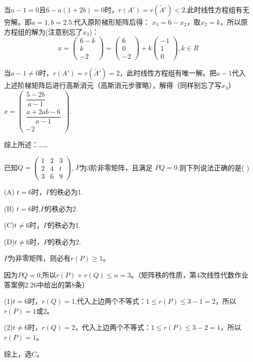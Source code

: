 \documentclass[a4paper]{report}
\begin{document}
\begin{jie}
当$a-1=0$且$6-a(1+2b)=0$时，$r(A')=r(\widetilde{A}')<2$,此时线性方程组有无穷解。即$a=1,b= 2.5$.代入原阶梯形矩阵后得：
$x_1=6-x_2$，取$x_2=k$，所以原方程组的解为(注意别忘了$x_3$)：
\begin{equation*}
  x=
  \begin{pmatrix}
   6-k\\ k\\ -2
  \end{pmatrix}=
  \begin{pmatrix}
    6\\ 0\\ -2
  \end{pmatrix}+k\begin{pmatrix}
                  -1\\ 1\\ 0
                \end{pmatrix},k\in R
\end{equation*}

当$a-1\neq 0$时，$r(A')=r(\widetilde{A}')=2$，此时线性方程组有唯一解。把$a-1$代入上述阶梯矩阵后进行高斯消元（高斯消元步骤略），解得（同样别忘了写$x_3$）$x
=\begin{pmatrix}
\dfrac{5-2b}{a-1}\\[2pt] \dfrac{a+2ab-6}{a-1}\\[2pt] -2
 \end{pmatrix}
$.

综上所述：……
\end{jie}

\EX 已知$Q=
\begin{pmatrix}
1&2&3\\
2&4&t\\
3&6&9
\end{pmatrix}
$,
$P$为3阶非零矩阵，且满足
$PQ=0$.则下列说法正确的是( )

(A) $t=6$时，$P$的秩必为1.

(B) $t=6$时,$P$的秩必为2.

(C)$t\neq 6$时，$P$的秩必为1.

(D)$t\neq6$时，$P$的秩必为2.

\begin{jie}
$P$为非零矩阵，则必有$r(P)\geq 1$。

因为$PQ=0$,所以$r(P)+r(Q)\leq n=3$。（矩阵秩的性质，第4次线性代数作业答案例2.26中给出的第8条）

(1)$t=6$时，$r(Q)=1$,代入上边两个不等式：$1\leq r(P)\leq 3-1=2$，所以$r(P)=1$或$2$。

(2)$t\neq 6$时，$r(Q)=2$，代入上边两个不等式：$1\leq r(P)\leq 3-2=1$，所以$r(P)=1$。

综上，选$C$。
\end{jie}
\end{document}
